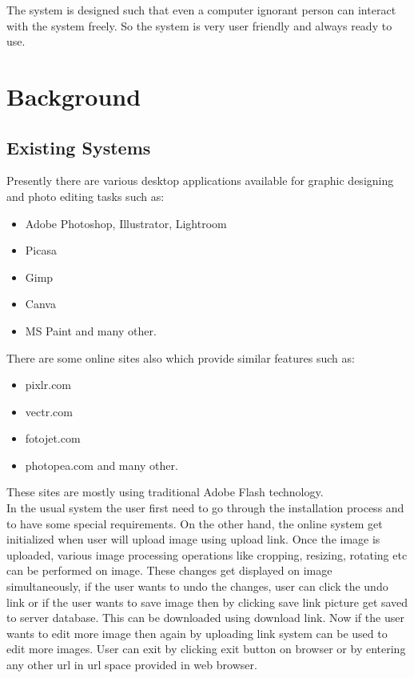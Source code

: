 \documentclass[12pt,a4 paper]{report}
\begin{document}
The system is designed such that even a computer ignorant person can interact with the system freely. So the system 
is very user friendly and always ready to use. \\

\chapter{Background}

\section{Existing Systems}
Presently there are various desktop applications available for graphic designing and photo editing tasks such as:

\begin{itemize}
\item Adobe Photoshop, Illustrator, Lightroom
\item Picasa
\item Gimp
\item Canva
\item MS Paint and many other.
\end{itemize}

There are some online sites also which provide similar features such as:

\begin{itemize}
\item pixlr.com
\item vectr.com
\item fotojet.com
\item photopea.com and many other.
\end{itemize}
These sites are mostly using traditional Adobe Flash technology.\\

In the usual system the user first need to go through the installation process and to have some special requirements. On the other hand, the online system get initialized when user will upload image using upload link. Once the image is uploaded, various image processing operations like cropping, resizing, rotating etc can be performed on image. These 
changes get displayed on image simultaneously, if the user wants to undo the changes, user can click the undo link or if the user wants to save image then by clicking save link picture get saved to server database. This can be downloaded using download link. Now if the user wants to edit more image then again by uploading link system can be used to edit more images.
User can exit by clicking exit button on browser or by entering any other url in url space provided in web browser.
\end{document}
